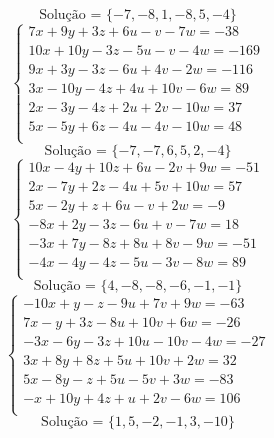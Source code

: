 \documentclass[12pt,oneside,a4paper]{article}
\begin{document}
\begin{equation*}
\text{Solução = }\{-7,-8,1,-8,5,-4\}
\end{equation*}
\vspace{\baselineskip}
\begin{equation*}
\begin{cases}
7x+9y+3z+6u-v-7w=-38 \\
10x+10y-3z-5u-v-4w=-169 \\
9x+3y-3z-6u+4v-2w=-116 \\
3x-10y-4z+4u+10v-6w=89 \\
2x-3y-4z+2u+2v-10w=37 \\
5x-5y+6z-4u-4v-10w=48 \\
\end{cases}
\end{equation*}
\begin{equation*}
\text{Solução = }\{-7,-7,6,5,2,-4\}
\end{equation*}
\vspace{\baselineskip}
\begin{equation*}
\begin{cases}
10x-4y+10z+6u-2v+9w=-51 \\
2x-7y+2z-4u+5v+10w=57 \\
5x-2y+z+6u-v+2w=-9 \\
-8x+2y-3z-6u+v-7w=18 \\
-3x+7y-8z+8u+8v-9w=-51 \\
-4x-4y-4z-5u-3v-8w=89 \\
\end{cases}
\end{equation*}
\begin{equation*}
\text{Solução = }\{4,-8,-8,-6,-1,-1\}
\end{equation*}
\vspace{\baselineskip}
\begin{equation*}
\begin{cases}
-10x+y-z-9u+7v+9w=-63 \\
7x-y+3z-8u+10v+6w=-26 \\
-3x-6y-3z+10u-10v-4w=-27 \\
3x+8y+8z+5u+10v+2w=32 \\
5x-8y-z+5u-5v+3w=-83 \\
-x+10y+4z+u+2v-6w=106 \\
\end{cases}
\end{equation*}
\begin{equation*}
\text{Solução = }\{1,5,-2,-1,3,-10\}
\end{equation*}
\end{document}
